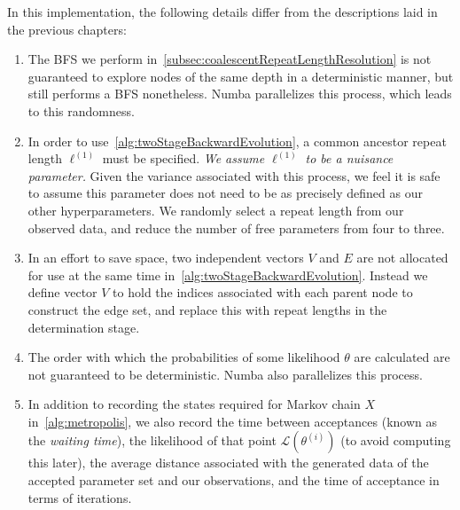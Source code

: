 In this implementation, the following details differ from the descriptions laid in the previous chapters:
\begin{enumerate}
    \item The BFS we perform in~\autoref{subsec:coalescentRepeatLengthResolution} is not guaranteed to explore nodes
        of the same depth in a deterministic manner, but still performs a BFS nonetheless.
        Numba parallelizes this process, which leads to this randomness.
    \item In order to use~\autoref{alg:twoStageBackwardEvolution}, a common ancestor repeat length $\ell^{(1)}$ must be
        specified.
        \emph{We assume $\ell^{(1)}$ to be a nuisance parameter.}
        Given the variance associated with this process, we feel it is safe to assume this parameter does not need to be
        as precisely defined as our other hyperparameters.
        We randomly select a repeat length from our observed data, and reduce the number of free parameters from
        four to three.
    \item In an effort to save space, two independent vectors $V$ and $E$ are not allocated for use at the same time
        in~\autoref{alg:twoStageBackwardEvolution}.
        Instead we define vector $V$ to hold the indices associated with each parent node to construct the edge set,
        and replace this with repeat lengths in the determination stage.
    \item The order with which the probabilities of some likelihood $\mathcal{\theta}$ are calculated are
        not guaranteed to be deterministic.
        Numba also parallelizes this process.
    \item In addition to recording the states required for Markov chain $X$ in~\autoref{alg:metropolis}, we also record
        the time between acceptances (known as the \emph{waiting time}), the likelihood of that point
        $\mathcal{L}(\theta^{(i)})$ (to avoid computing this later), the average distance associated with the generated
        data of the accepted parameter set and our observations, and the time of acceptance in terms of iterations.
\end{enumerate}

